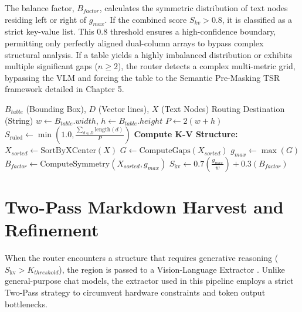 The balance factor, $B_{factor}$, calculates the symmetric distribution of text nodes residing left or right of $g_{max}$. If the combined score $S_{kv} > 0.8$, it is classified as a strict key-value list. This 0.8 threshold ensures a high-confidence boundary, permitting only perfectly aligned dual-column arrays to bypass complex structural analysis. If a table yields a highly imbalanced distribution or exhibits multiple significant gaps ($n \geq 2$), the router detects a complex multi-metric grid, bypassing the VLM and forcing the table to the Semantic Pre-Masking TSR framework detailed in Chapter 5.

\begin{algorithm}[H]
\caption{Table Type Classification and Routing Engine}
\label{alg:table_routing}
\begin{algorithmic}[1]
\REQUIRE $B_{table}$ (Bounding Box), $D$ (Vector lines), $X$ (Text Nodes)
\ENSURE Routing Destination (String)
\STATE $w \leftarrow B_{table}.width$, $h \leftarrow B_{table}.height$
\STATE $P \leftarrow 2(w + h)$
\STATE $S_{\text{ruled}} \leftarrow \min \left( 1.0, \frac{\sum_{d \in D} \text{length}(d)}{P} \right)$
    \RETURN {}
\ENDIF
\STATE \textbf{Compute K-V Structure:}
\STATE $X_{sorted} \leftarrow \text{SortByXCenter}(X)$
\STATE $G \leftarrow \text{ComputeGaps}(X_{sorted})$
\STATE $g_{max} \leftarrow \max(G)$
\STATE $B_{factor} \leftarrow \text{ComputeSymmetry}(X_{sorted}, g_{max})$
\STATE $S_{\text{kv}} \leftarrow 0.7 \left( \frac{g_{max}}{w} \right) + 0.3 \left( B_{factor} \right)$
    \RETURN {}
\ELSE
    \RETURN {}
\ENDIF
\end{algorithmic}
\end{algorithm}

\section{Two-Pass Markdown Harvest and Refinement}
\label{sec:vlm_specialist}

When the router encounters a structure that requires generative reasoning ($S_{\text{kv}} > K_{threshold}$), the region is passed to a Vision-Language Extractor \citep{gpt4v, qwen25}. Unlike general-purpose chat models, the extractor used in this pipeline employs a strict Two-Pass strategy to circumvent hardware constraints and token output bottlenecks.

